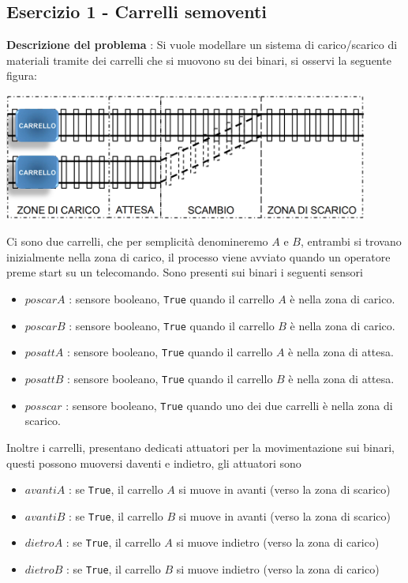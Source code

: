 \documentclass[10pt, letterpaper]{report}
\begin{document}
\subsection{Esercizio 1 - Carrelli semoventi}
\textbf{Descrizione del problema} : Si vuole modellare un sistema di carico/scarico di materiali tramite dei carrelli che si muovono su dei binari, si osservi la seguente figura:
\begin{center}
    \includegraphics[width=0.9\textwidth ]{images/carrelli.png}
\end{center}
Ci sono due carrelli, che per semplicità denomineremo $A$ e $B$, entrambi si trovano inizialmente nella zona di carico, il processo viene avviato quando un operatore preme start su un telecomando. Sono presenti sui binari i seguenti sensori\begin{itemize}
    \item \color{darkgreen}$poscarA$\color{black} : sensore booleano, \texttt{True} quando il carrello $A$ è nella zona di carico.
    \item \color{darkgreen}$poscarB$\color{black} : sensore booleano, \texttt{True} quando il carrello $B$ è nella zona di carico.
    \item \color{darkgreen}$posattA$\color{black} : sensore booleano, \texttt{True} quando il carrello $A$ è nella zona di attesa.
    \item \color{darkgreen}$posattB$\color{black} : sensore booleano, \texttt{True} quando il carrello $B$ è nella zona di attesa.
    \item \color{darkgreen}$posscar$\color{black} : sensore booleano, \texttt{True} quando uno dei due carrelli è nella zona di scarico.
\end{itemize}
Inoltre i carrelli, presentano dedicati attuatori per la movimentazione sui binari, questi possono muoversi daventi e indietro, gli attuatori sono\begin{itemize}
    \item \color{gray}$avantiA$\color{black} : se \texttt{True}, il carrello $A$ si muove in avanti (verso la zona di scarico) 
    \item \color{gray}$avantiB$\color{black} : se \texttt{True}, il carrello $B$ si muove in avanti (verso la zona di scarico) 
    \item \color{gray}$dietroA$\color{black} : se \texttt{True}, il carrello $A$ si muove indietro (verso la zona di carico) 
    \item \color{gray}$dietroB$\color{black} : se \texttt{True}, il carrello $B$ si muove indietro (verso la zona di carico)
\end{itemize}
\end{document}
